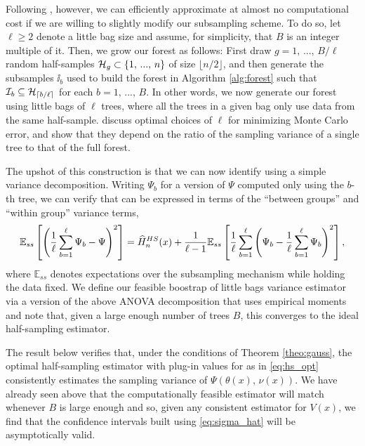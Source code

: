 \documentclass[aos]{imsart}
\theoremstyle{plain}
\theoremstyle{definition}
\theoremstyle{remark}
\begin{document}
\begin{CJK}{UTF8}{gbsn}
Following \citet{sexton2009standard}, however, we can efficiently approximate 
at almost no computational cost if we are willing to slightly modify our subsampling scheme.
To do so, let $\ell \geq 2$ denote a little bag size and assume, for simplicity, that $B$ is an integer
multiple of it.
Then, we grow our forest as follows: First draw $g = 1, \, ..., \, B/\ell$ random half-samples
$\mathcal{H}_g \subset \left\{1, \, ..., \, n\right\}$ of size $\lfloor n/2 \rfloor$, and then generate the subsamples
$\ii_b$ used to build the forest in Algorithm \ref{alg:forest} such that $\mathcal{I}_b \subseteq \mathcal{H}_{\lceil b/\ell \rceil}$
for each $b = 1, \, ..., \, B$. In other words, we now generate our forest using little bags of
$\ell$ trees, where all the trees in a given bag only use data from the same half-sample.
\citet{sexton2009standard} discuss optimal choices of $\ell$ for minimizing Monte Carlo error,
and show that they depend on the ratio of the sampling variance of a single tree to that of the full forest.

The upshot of this construction is that we can now identify 
using a simple variance decomposition. Writing $\Psi_b$ for a version of $\Psi$
computed only using the $b$-th tree, we can verify that  can
be expressed in terms of the ``between groups'' and ``within group'' variance terms,
\begin{equation*}
\EE[ss]{\p{\frac{1}{\ell} \sum_{b = 1}^\ell \Psi_b - \Psi}^2} = \hH_n^{HS}(x) + \frac{1}{\ell - 1} \EE[ss]{\frac{1}{\ell} \sum_{b = 1}^\ell\p{\Psi_b -\frac{1}{\ell} \sum_{b = 1}^\ell \Psi_b}^2},
\end{equation*}
where $\mathbb{E}_{ss}$ denotes expectations over the subsampling mechanism while
holding the data fixed. We define our feasible boostrap of little bags variance estimator
 via a version of the above ANOVA decomposition that uses empirical moments
and note that, given a large enough number of trees $B$, this converges to the ideal
half-sampling estimator.

The result below verifies that, under the conditions of Theorem \ref{theo:gauss},
the optimal half-sampling estimator 
with plug-in values for  as in \eqref{eq:hs_opt}
consistently estimates the sampling variance of $\Psi(\theta(x), \, \nu(x))$.
We have already seen above that the computationally feasible estimator
 will match  whenever $B$ is large enough and so,
given any consistent estimator  for $V(x)$, we find that the confidence
intervals built using \eqref{eq:sigma_hat} will be asymptotically valid.


\end{CJK}
\end{document}
